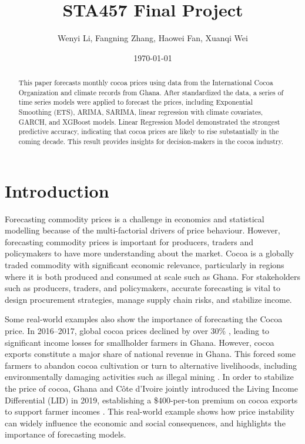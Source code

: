 \documentclass[10pt]{article}
\title{STA457 Final Project
}
\author{Wenyi Li, Fangning Zhang, Haowei Fan, Xuanqi Wei}
\date{\today}
\begin{document}
\maketitle
\thispagestyle{empty}

\vspace{20em}


\begin{abstract}
    This paper forecasts monthly cocoa prices using data from the International Cocoa Organization and climate records from Ghana. After standardized the data, a series of time series models were applied to forecast the prices, including Exponential Smoothing (ETS), ARIMA, SARIMA, linear regression with climate covariates, GARCH, and XGBoost models. Linear Regression Model demonstrated the strongest predictive accuracy, indicating that cocoa prices are likely to rise substantially in the coming decade. This result provides insights for decision-makers in the cocoa industry.
\end{abstract}


\newpage
\clearpage
\pagestyle{fancy}

\tableofcontents
\thispagestyle{empty}

\newpage

\setcounter{page}{1}

\section{Introduction}
\noindent
Forecasting commodity prices is a challenge in economics and statistical modelling because of the multi-factorial drivers of price behaviour. However, forecasting commodity prices is important for producers, traders and policymakers to have more understanding about the market. Cocoa is a globally traded commodity with significant economic relevance, particularly in regions where it is both produced and consumed at scale such as Ghana. For stakeholders such as producers, traders, and policymakers, accurate forecasting is vital to design procurement strategies, manage supply chain risks, and stabilize income.

\noindent
Some real-world examples also show the importance of forecasting the Cocoa price. In 2016–2017, global cocoa prices declined by over 30\% \cite{icco2016november}, leading to significant income losses for smallholder farmers in Ghana. However, cocoa exports constitute a major share of national revenue in Ghana. This forced some farmers to abandon cocoa cultivation or turn to alternative livelihoods, including environmentally damaging activities such as illegal mining \cite{bryant2021political}. In order to stabilize the price of cocoa, Ghana and Côte d’Ivoire jointly introduced the Living Income Differential (LID) in 2019, establishing a \$400-per-ton premium on cocoa exports to support farmer incomes \cite{jrc2021lid}. This real-world example shows how price instability can widely influence the economic and social consequences, and highlights the importance of forecasting models.
\end{document}
